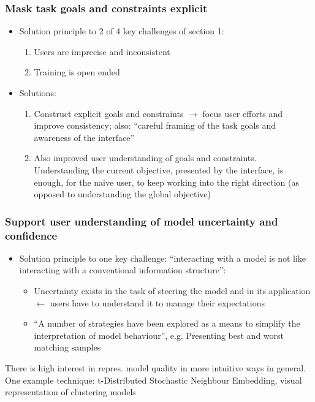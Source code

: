 \documentclass[12pt,a4paper]{article}
\begin{document}
\subsubsection{Mask task goals and constraints explicit}
\begin{itemize}
\item Solution principle to 2 of 4 key challenges of section 1:
\begin{enumerate}
\item Users are imprecise and inconsistent
\item Training is open ended
\end{enumerate}
\item Solutions:
\begin{enumerate}
\item Construct explicit goals and constraints $\rightarrow$ focus user efforts and improve consistency; also: ``careful framing of the task goals and awareness of the interface''
\item Also improved user understanding of goals and constraints. Understanding the current objective, presented by the interface, is enough, for the naive user, to keep working into the right direction (as opposed to understanding the global objective)
\end{enumerate}
\end{itemize}
\subsubsection{Support user understanding of model uncertainty and confidence}
\begin{itemize}
\item Solution principle to one key challenge: ``interacting with a model is not like interacting with a conventional information structure'':
\begin{itemize}
\item Uncertainty exists in the task of steering the model and in its application $\leftarrow$ users have to understand it to manage their expectations
\item ``A number of strategies have been explored as a means to simplify the interpretation of model behaviour'', e.g. Presenting best and worst matching samples
\end{itemize}
\end{itemize}
\begin{description}
\item There is high interest in repres. model quality in more intuitive ways in general. One example technique: t-Distributed Stochastic Neighbour Embedding, visual representation of clustering models
\end{description}
\end{document}
